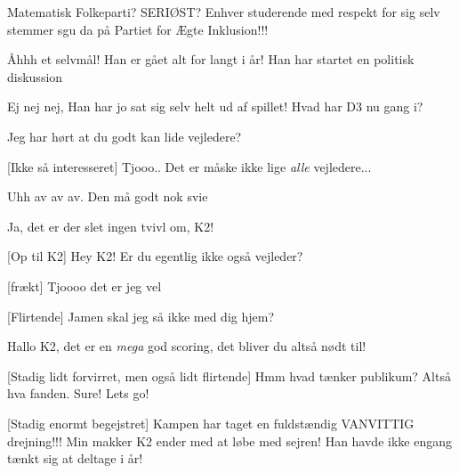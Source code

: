 \documentclass[a4paper,11pt]{article}
\begin{document}
\begin{sketch}
 Matematisk Folkeparti? SERIØST? Enhver studerende med respekt for sig selv stemmer sgu da på Partiet for Ægte Inklusion!!!

 Åhhh et selvmål! Han er gået alt for langt i år! Han har startet en politisk diskussion

 Ej nej nej, Han har jo sat sig selv helt ud af spillet! Hvad har D3 nu gang i?


 Jeg har hørt at du godt kan lide vejledere?

[Ikke så interesseret] Tjooo.. Det er måske ikke lige \emph{alle} vejledere...

 Uhh av av av. Den må godt nok svie

 Ja, det er der slet ingen tvivl om, K2!

[Op til K2] Hey K2! Er du egentlig ikke også vejleder?


[frækt] Tjoooo det er jeg vel

[Flirtende] Jamen skal jeg så ikke med dig hjem?


 Hallo K2, det er en \emph{mega} god scoring, det bliver du altså nødt til!

[Stadig lidt forvirret, men også lidt flirtende] Hmm hvad tænker publikum? Altså hva fanden. Sure! Lets go!


[Stadig enormt begejstret] Kampen har taget en fuldstændig VANVITTIG drejning!!! Min makker K2 ender med at løbe med sejren! Han havde ikke engang tænkt sig at deltage i år! 

\end{sketch}
\end{document}
